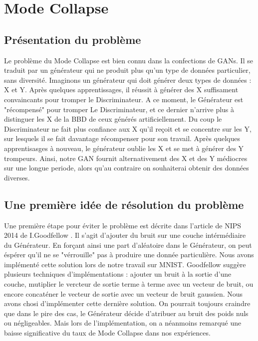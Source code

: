 \section{Mode Collapse}
	\subsection{Présentation du problème}
		Le problème du Mode Collapse est bien connu dans la confections de GANs. Il se traduit par un générateur qui ne produit plus qu'un type de données particulier, sans diversité. 
		Imaginons un générateur qui doit générer deux types de données : X et Y. Après quelques apprentissages, il réussit à générer des X suffisament convaincants pour tromper le Discriminateur. A ce moment, le Générateur est "récompensé" pour tromper Le Discriminateur, et ce dernier n'arrive plus à distinguer les X de la BBD de ceux générés artificiellement. Du coup le Discriminateur ne fait plus confiance aux X qu'il reçoit et se concentre sur les Y, sur lesquels il se fait davantage récompenser pour son travail. Après quelques apprentisasges à nouveau, le générateur oublie les X et se met à générer des Y trompeurs.
		Ainsi, notre GAN fournit alternativement des X et des Y médiocres sur une longue periode, alors qu'au contraire on souhaiterai obtenir des données diverses.
	\subsection{Une première idée de résolution du problème}
		Une première étape pour éviter le problème est décrite dans l'article de NIPS 2014 de I.Goodfellow \cite{nips-2014}. Il s'agit d'ajouter du bruit sur une couche intérmédiaire du Générateur. En forçant ainsi une part d'aléatoire dans le Générateur, on peut éspérer qu'il ne se "vérrouille" pas à produire une donnée particulière. 
		Nous avons implémenté cette solution lors de notre travail sur MNIST. Goodfellow suggère plusieurs techniques d'implémentations : ajouter un bruit à la sortie d'une couche, mutiplier le vercteur de sortie terme à terme avec un vecteur de bruit, ou encore concaténer le vecteur de sortie avec un vecteur de bruit gaussien. Nous avons chosi d'implémenter cette dernière solution. On pourrait toujours craindre que dans le pire des cas, le Générateur décide d'atribuer au bruit des poids nuls ou négligeables. Mais lors de l'implémentation, on a néanmoins remarqué une baisse significative du taux de Mode Collapse dans nos expériences.
